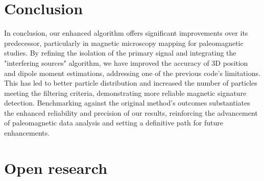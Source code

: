 \section{Conclusion}

In conclusion, our enhanced algorithm offers significant improvements over its predecessor, particularly in magnetic microscopy mapping for paleomagnetic studies. By refining the isolation of the primary signal and integrating the "interfering sources" algorithm, we have improved the accuracy of 3D position and dipole moment estimations, addressing one of the previous code's limitations. This has led to better particle distribution and increased the number of particles meeting the filtering criteria, demonstrating more reliable magnetic signature detection. Benchmarking against the original method's outcomes substantiates the enhanced reliability and precision of our results, reinforcing the advancement of paleomagnetic data analysis and setting a definitive path for future enhancements.


\section{Open research}





